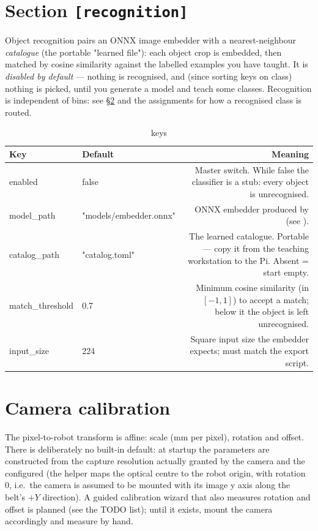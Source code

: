\section{Section \texttt{[recognition]}}
%
Object recognition pairs an ONNX image embedder with a nearest-neighbour
\emph{catalogue} (the portable "learned file"): each object crop is embedded,
then matched by cosine similarity against the labelled examples you have
taught. It is \emph{disabled by default} --- nothing is recognised, and (since
sorting keys on class) nothing is picked, until you generate a model and teach
some classes. Recognition is independent of bins: see \S\ref{sec:calibration}
and the \cfg{[sorting]} assignments for how a recognised class is routed.
\begin{table}[h]
  \centering
  \begin{tabularx}{\textwidth}{KTD}
    \toprule
    \textbf{Key} & \textbf{Default} & \textbf{Meaning} \\
    \midrule
    enabled & false & Master switch. While false the classifier is a stub:
      every object is unrecognised. \\
    model\_path & "models/embedder.onnx" & ONNX embedder produced by
       (see ). \\
    catalog\_path & "catalog.toml" & The learned catalogue. Portable --- copy
      it from the teaching workstation to the Pi. Absent = start empty. \\
    match\_threshold & 0.7 & Minimum cosine similarity (in $[-1,1]$) to accept
      a match; below it the object is left unrecognised. \\
    input\_size & 224 & Square input size the embedder expects; must match the
      export script. \\
    \bottomrule
  \end{tabularx}
  \caption{\cfg{[recognition]} keys}
\end{table}

\section{Camera calibration}
\label{sec:calibration}
%
The pixel-to-robot transform is affine: scale (mm per pixel), rotation
and offset. There is deliberately no built-in default: at startup the
parameters are constructed from the capture resolution actually granted
by the camera and the configured  (the helper
 maps the
optical centre to the robot origin, with rotation 0, i.e.\ the camera is
assumed to be mounted with its image y axis along the belt's $+Y$
direction). A guided calibration wizard that also measures rotation and
offset is planned (see the TODO list); until it exists, mount the camera
accordingly and measure  by hand.


